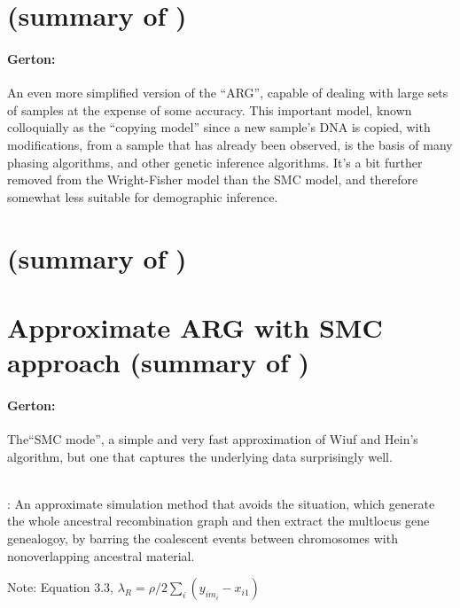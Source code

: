 \section{(summary of \citet{Li2003})}
{\color{red}\paragraph{Gerton:}An even more simplified version of the ``ARG'', capable of dealing with large sets of samples at the expense of some accuracy.  This important model, known colloquially as the ``copying model'' since a new sample's DNA is copied, with modifications, from a sample that has already been observed, is the basis of many phasing algorithms, and other genetic inference algorithms.  It's a bit further removed from the Wright-Fisher model than the SMC model, and therefore somewhat less suitable for demographic inference.}


\section{(summary of \citet{Song2005})}

\section{Approximate ARG with SMC approach (summary of \citet{McVean2005})}
{\color{red}\paragraph{Gerton:}The``SMC mode'', a simple and very fast approximation of Wiuf and Hein's algorithm, but one that captures the underlying data surprisingly well.}\\
{\color{blue}
\citet{Wakeley2008}:
An approximate simulation method that avoids the situation, which generate the whole ancestral recombination graph and then extract the multlocus gene genealogoy, by barring the coalescent events between chromosomes with nonoverlapping ancestral material.
}

{\color{red} Note: \citet{McVean2005} Equation 3.3, $\lambda_R=\rho/2\sum_i(y_{im_i}-x_{i1})$}

